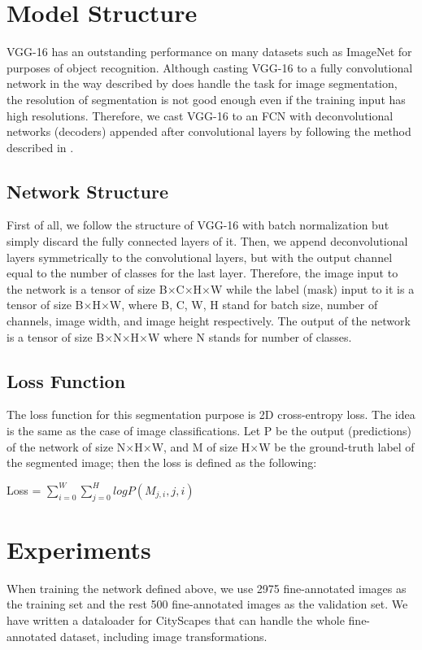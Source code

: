 \documentclass[10pt,twocolumn,letterpaper]{article}
\begin{document}
\section{Model Structure}
VGG-16 has an outstanding performance on many datasets such as ImageNet for purposes of object recognition. Although casting VGG-16 \cite{Simonyan14c} to a fully convolutional network in the way described by \cite{Long_2015_CVPR} does handle the task for image segmentation, the resolution of segmentation is not good enough even if the training input has high resolutions. Therefore, we cast VGG-16 to an FCN with deconvolutional networks (decoders) appended after convolutional layers by following the method described in \cite{badrinarayanan2015segnet2}.

\subsection{Network Structure}
First of all, we follow the structure of VGG-16 with batch normalization but simply discard the fully connected layers of it. Then, we append deconvolutional layers symmetrically to the convolutional layers, but with the output channel equal to the number of classes for the last layer. Therefore, the image input to the network is a tensor of size B$\times$C$\times$H$\times$W while the label (mask) input to it is a tensor of size B$\times$H$\times$W, where B, C, W, H stand for batch size, number of channels, image width, and image height respectively. The output of the network is a tensor of size B$\times$N$\times$H$\times$W where N stands for number of classes.

\subsection{Loss Function}
The loss function for this segmentation purpose is 2D cross-entropy loss. The idea is the same as the case of image classifications. Let P be the output (predictions) of the network of size N$\times$H$\times$W, and M of size H$\times$W be the ground-truth label of the segmented image; then the loss is defined as the following:
\begin{center}
	Loss = $\sum_{i=0}^{W}\sum_{j=0}^{H}logP(M_{j,i},j,i)$
\end{center}

\section{Experiments}
When training the network defined above, we use 2975 fine-annotated images as the training set and the rest 500 fine-annotated images as the validation set. We have written a dataloader for CityScapes that can handle the whole fine-annotated dataset, including image transformations.
\end{document}
